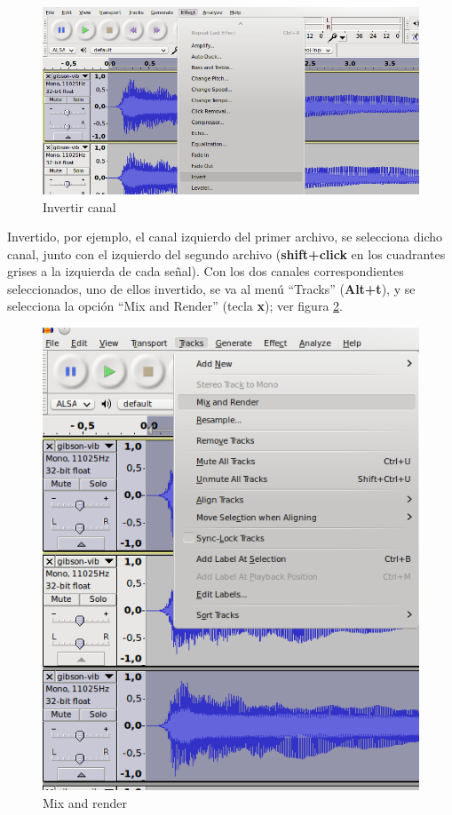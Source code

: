\begin{figure}[H]
    \centering
    \includegraphics[scale=0.68]{imagenes/audacity-invert.png}
    \caption{Invertir canal}
    \label{fig:audacity-invert}
\end{figure}

Invertido, por ejemplo, el canal izquierdo del primer archivo, se selecciona dicho canal, junto con el izquierdo del segundo archivo (\textbf{shift+click} en los cuadrantes grises a la izquierda de cada señal). Con los dos canales correspondientes seleccionados, uno de ellos invertido, se va al menú ``Tracks'' (\textbf{Alt+t}), y se selecciona la opción ``Mix and Render'' (tecla \textbf{x}); ver figura \ref{fig:audacity-mix-and-render}.

\begin{figure}[H]
    \centering
    \includegraphics[scale=0.70]{imagenes/audacity-mix-and-render.png}
    \caption{Mix and render}
    \label{fig:audacity-mix-and-render}
\end{figure}


